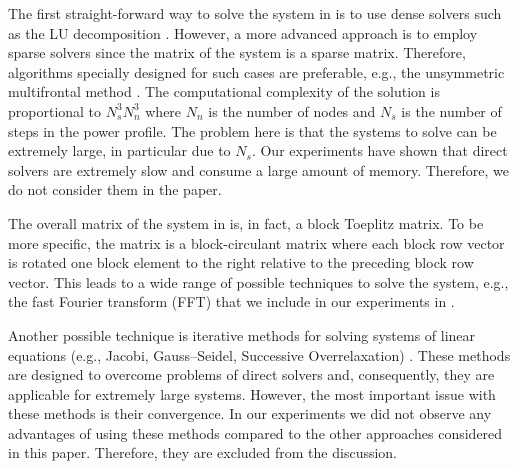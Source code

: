 The first straight-forward way to solve the system in  is to use dense solvers such as the LU decomposition \cite{press2007}. However, a more advanced approach is to employ sparse solvers since the matrix of the system is a sparse matrix. Therefore, algorithms specially designed for such cases are preferable, e.g., the unsymmetric multifrontal method \cite{umfpack2004}. The computational complexity of the solution is proportional to $N_s^3 N_n^3$ \cite{press2007} where $N_n$ is the number of nodes and $N_s$ is the number of steps in the power profile. The problem here is that the systems to solve can be extremely large, in particular due to $N_s$. Our experiments have shown that direct solvers are extremely slow and consume a large amount of memory. Therefore, we do not consider them in the paper.

The overall matrix of the system in  is, in fact, a block Toeplitz matrix. To be more specific, the matrix is a block-circulant matrix where each block row vector is rotated one block element to the right relative to the preceding block row vector. This leads to a wide range of possible techniques to solve the system, e.g., the fast Fourier transform (FFT) \cite{mazancourt1983} that we include in our experiments in .

Another possible technique is iterative methods for solving systems of linear equations (e.g., Jacobi, Gauss--Seidel, Successive Overrelaxation) \cite{press2007}. These methods are designed to overcome problems of direct solvers and, consequently, they are applicable for extremely large systems. However, the most important issue with these methods is their convergence. In our experiments we did not observe any advantages of using these methods compared to the other approaches considered in this paper. Therefore, they are excluded from the discussion.
